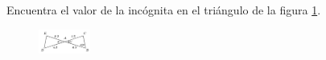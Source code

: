 \question[10]  Encuentra el valor de la incógnita en el triángulo de la figura \ref{fig:angle_triangle_12}.
\begin{figure}[H]
    \begin{center}
        \includegraphics[width=0.15\textwidth]{../images/angle_triangle_12.png}
    \end{center}
    \caption{}
    \label{fig:angle_triangle_12}
\end{figure}